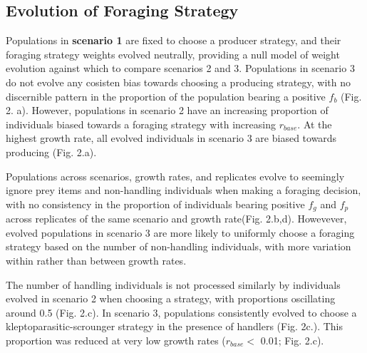 \documentclass[11pt]{article}
\begin{document}
\subsection*{Evolution of Foraging Strategy}

Populations in \textbf{scenario 1} are fixed to choose a producer strategy, and their foraging strategy weights evolved neutrally, providing a null model of weight evolution against which to compare scenarios 2 and 3.
Populations in scenario 3 do not evolve any cosisten bias towards choosing a producing strategy, with no discernible pattern in the proportion of the population bearing a positive $f_b$ (Fig. 2. a).
However, populations in scenario 2 have an increasing proportion of individuals biased towards a foraging strategy with increasing $r_{base}$.
At the highest growth rate, all evolved individuals in scenario 3 are biased towards producing (Fig. 2.a).

Populations across scenarios, growth rates, and replicates evolve to seemingly ignore prey items and non-handling individuals when making a foraging decision, with no consistency in the proportion of individuals bearing positive $f_g$ and $f_p$ across replicates of the same scenario and growth rate(Fig. 2.b,d).
Howevever, evolved populations in scenario 3 are more likely to uniformly choose a foraging strategy based on the number of non-handling individuals, with more variation within rather than between growth rates.

The number of handling individuals is not processed similarly by individuals evolved in scenario 2 when choosing a strategy, with proportions oscillating around 0.5 (Fig. 2.c).
In scenario 3, populations consistently evolved to choose a kleptoparasitic-scrounger strategy in the presence of handlers (Fig. 2c.).
This proportion was reduced at very low growth rates ($r_{base} <$ 0.01; Fig. 2.c).
\end{document}
